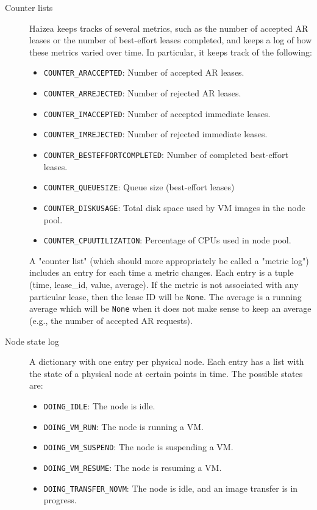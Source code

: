 \begin{description}
 \item[Counter lists] Haizea keeps tracks of several metrics, such as the number of accepted AR leases or the number of best-effort leases completed, and keeps a log of how these metrics varied over time. In particular, it keeps track of the following:
\begin{itemize}

 \item \texttt{COUNTER\_ARACCEPTED}: Number of accepted AR leases.
 \item \texttt{COUNTER\_ARREJECTED}: Number of rejected AR leases.
 \item \texttt{COUNTER\_IMACCEPTED}: Number of accepted immediate leases.
 \item \texttt{COUNTER\_IMREJECTED}: Number of rejected immediate leases.
 \item \texttt{COUNTER\_BESTEFFORTCOMPLETED}: Number of completed best-effort leases.
 \item \texttt{COUNTER\_QUEUESIZE}: Queue size (best-effort leases)
 \item \texttt{COUNTER\_DISKUSAGE}: Total disk space used by VM images in the node pool.
 \item \texttt{COUNTER\_CPUUTILIZATION}: Percentage of CPUs used in node pool.
\end{itemize}
      A "counter list" (which should more appropriately be called a "metric log") includes an entry for each time a metric changes. Each entry is a tuple (time, lease\_id, value, average). If the metric is not associated with any particular lease, then the lease ID will be \texttt{None}. The average is a running average which will be \texttt{None} when it does not make sense to keep an average (e.g., the number of accepted AR requests).
\item[Node state log] A dictionary with one entry per physical node. Each entry has a list with the state of a physical node at certain points in time. The possible states are:
\begin{itemize}
 \item  \texttt{DOING\_IDLE}: The node is idle.
 \item \texttt{DOING\_VM\_RUN}: The node is running a VM.
 \item \texttt{DOING\_VM\_SUSPEND}: The node is suspending a VM.
 \item \texttt{DOING\_VM\_RESUME}: The node is resuming a VM.
 \item \texttt{DOING\_TRANSFER\_NOVM}: The node is idle, and an image transfer is in progress.

\end{itemize}
\end{description}
